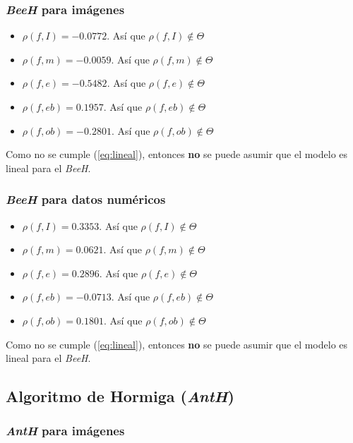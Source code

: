 \subsubsection{\emph{BeeH} para imágenes}

\begin{itemize}
    \item $\rho(f, I) = -0.0772$. Así que $\rho(f, I) \notin \Theta$
    \item $\rho(f, m) = -0.0059$. Así que $\rho(f, m) \notin \Theta$
    \item $\rho(f, e) = -0.5482$. Así que $\rho(f, e) \notin \Theta$
    \item $\rho(f, eb) = 0.1957$. Así que $\rho(f, eb) \notin \Theta$
    \item $\rho(f, ob) = -0.2801$. Así que $\rho(f, ob) \notin \Theta$
\end{itemize}

    Como no se cumple (\ref{eq:lineal}), entonces \textbf{no} se puede asumir
que el modelo es lineal para el \emph{BeeH}.

\subsubsection{\emph{BeeH} para datos numéricos}

\begin{itemize}
    \item $\rho(f, I) = 0.3353$. Así que $\rho(f, I) \notin \Theta$
    \item $\rho(f, m) = 0.0621$. Así que $\rho(f, m) \notin \Theta$
    \item $\rho(f, e) = 0.2896$. Así que $\rho(f, e) \notin \Theta$
    \item $\rho(f, eb) = -0.0713$. Así que $\rho(f, eb) \notin \Theta$
    \item $\rho(f, ob) = 0.1801$. Así que $\rho(f, ob) \notin \Theta$
\end{itemize}

    Como no se cumple (\ref{eq:lineal}), entonces \textbf{no} se puede asumir
que el modelo es lineal para el \emph{BeeH}.

\subsection{Algoritmo de Hormiga (\emph{AntH})}

\subsubsection{\emph{AntH} para imágenes}

